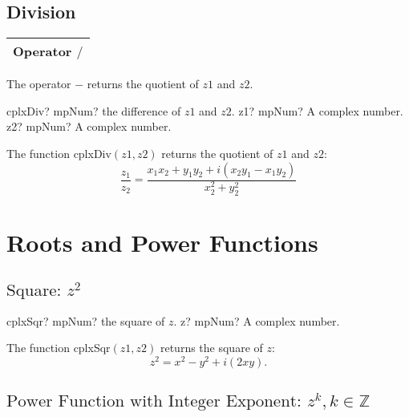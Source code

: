 \subsection{Division}

\begin{tabular}{p{481pt}}
	\toprule
	\textsf{Operator \textbf{$/$}} \\
	\bottomrule
\end{tabular}

\vspace{0.3cm}
The operator $-$ returns the quotient of $z1$ and $z2$.

\vspace{0.3cm}
\begin{mpFunctionsExtract}
	\mpFunctionTwo
	{cplxDiv? mpNum? the difference of $z1$ and $z2$.}
	{z1? mpNum? A complex number.}
	{z2? mpNum? A complex number.}
\end{mpFunctionsExtract}

\vspace{0.3cm}
The function \textsf{cplxDiv$(z1, z2)$} returns the quotient of $z1$ and $z2$: 
\begin{equation}
	\frac{z_1}{z_2} = \frac{x_1 x_2 + y_1 y_2 + i(x_2 y_1 - x_1 y_2)}{x_2^2 + y_2^2}
\end{equation}





\section{Roots and Power Functions}
\label{RootsAndPowersCplx}


\subsection{\texorpdfstring{$\text{Square: }z^2$}{Square}}

\begin{mpFunctionsExtract}
	\mpFunctionOne
	{cplxSqr? mpNum? the square of $z$.}
	{z? mpNum? A complex number.}
\end{mpFunctionsExtract}

\vspace{0.3cm}
The function \textsf{cplxSqr$(z1, z2)$} returns the square of $z$: 
\begin{equation}
	z^2 = x^2-y^2 + i(2xy).
\end{equation}



\subsection{\texorpdfstring{$\text{Power Function with Integer Exponent: }z^k, k \in  \mathbb{Z}$}{powerxk}}

